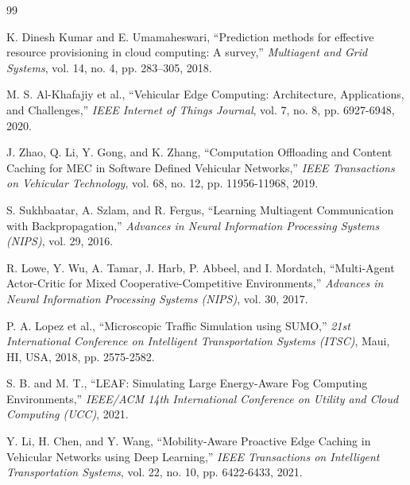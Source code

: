 \documentclass[12pt,a4paper]{report}
\begin{document}
\begin{thebibliography}{99}

K. Dinesh Kumar and E. Umamaheswari, “Prediction methods for effective resource provisioning in cloud computing: A survey,” \textit{Multiagent and Grid Systems}, vol. 14, no. 4, pp. 283--305, 2018.

M. S. Al-Khafajiy et al., ``Vehicular Edge Computing: Architecture, Applications, and Challenges,'' \textit{IEEE Internet of Things Journal}, vol. 7, no. 8, pp. 6927-6948, 2020.

J. Zhao, Q. Li, Y. Gong, and K. Zhang, ``Computation Offloading and Content Caching for MEC in Software Defined Vehicular Networks,'' \textit{IEEE Transactions on Vehicular Technology}, vol. 68, no. 12, pp. 11956-11968, 2019.

S. Sukhbaatar, A. Szlam, and R. Fergus, ``Learning Multiagent Communication with Backpropagation,'' \textit{Advances in Neural Information Processing Systems (NIPS)}, vol. 29, 2016.

R. Lowe, Y. Wu, A. Tamar, J. Harb, P. Abbeel, and I. Mordatch, ``Multi-Agent Actor-Critic for Mixed Cooperative-Competitive Environments,'' \textit{Advances in Neural Information Processing Systems (NIPS)}, vol. 30, 2017.

P. A. Lopez et al., ``Microscopic Traffic Simulation using SUMO,'' \textit{21st International Conference on Intelligent Transportation Systems (ITSC)}, Maui, HI, USA, 2018, pp. 2575-2582.

S. B. and M. T., ``LEAF: Simulating Large Energy-Aware Fog Computing Environments,'' \textit{IEEE/ACM 14th International Conference on Utility and Cloud Computing (UCC)}, 2021.

Y. Li, H. Chen, and Y. Wang, ``Mobility-Aware Proactive Edge Caching in Vehicular Networks using Deep Learning,'' \textit{IEEE Transactions on Intelligent Transportation Systems}, vol. 22, no. 10, pp. 6422-6433, 2021.

\end{thebibliography}
\end{document}
